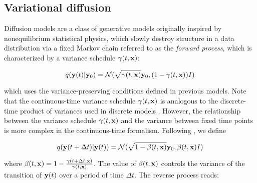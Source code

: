 

\subsection{Variational diffusion}

Diffusion models \parencite{Ho2020,Song2021} are a class of generative models originally inspired by nonequilibrium statistical physics, which slowly destroy structure in a data distribution via a fixed Markov chain referred to as the \emph{forward process}, which is characterized by a variance schedule $\gamma(t,\bold{x})$:

\begin{equation*}
q(\bold{y}(t)\lvert\bold{y}_{0}) = \mathcal{N}(\sqrt{\gamma(t,\bold{x})}\bold{y}_{0},(1-\gamma(t,\bold{x}))I)
\end{equation*}

which uses the variance-preserving conditions defined in previous models. Note that the continuous-time variance schedule $\gamma(t,\bold{x})$ is analogous to the discrete-time product of variances used in discrete models \parencite{Ho2020}. However, the relationship between the variance schedule $\gamma(t,\bold{x})$ and the variance between fixed time points is more complex in the continuous-time formalism. Following \parencite{Maggiora2023}, we define

\begin{equation*}
q(\bold{y}(t+\Delta t)\lvert\bold{y}(t)) = \mathcal{N}(\sqrt{1-\beta(t,\bold{x})}\bold{y}_{0},\beta(t,\bold{x})I)
\end{equation*}

where $\beta(t,\bold{x}) = 1 - \frac{\gamma(t+\Delta t,\bold{x})}{\gamma(t,\bold{x})}$. The value of $\beta(t,\bold{x})$ controls the variance of the transition of $\bold{y}(t)$ over a period of time $\Delta t$. The reverse process reads:

